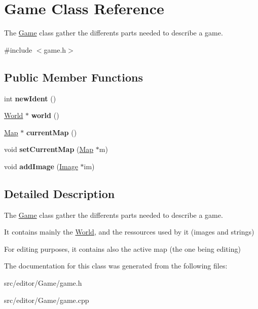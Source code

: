 \hypertarget{class_game}{\section{\-Game \-Class \-Reference}
\label{class_game}
}


\-The \hyperlink{class_game}{\-Game} class gather the differents parts needed to describe a game.  




{\ttfamily \#include $<$game.\-h$>$}

\subsection*{\-Public \-Member \-Functions}
\begin{DoxyCompactItemize}
\item 
\hypertarget{class_game_aeed0ba100700fb2f5d701fcf14d8871e}{int {\bfseries new\-Ident} ()}\label{class_game_aeed0ba100700fb2f5d701fcf14d8871e}

\item 
\hypertarget{class_game_a38feaf6c233d25c2ad353bab65559790}{\hyperlink{class_world}{\-World} $\ast$ {\bfseries world} ()}\label{class_game_a38feaf6c233d25c2ad353bab65559790}

\item 
\hypertarget{class_game_a3b242dcb7703b409692ce0c91e799a8c}{\hyperlink{class_map}{\-Map} $\ast$ {\bfseries current\-Map} ()}\label{class_game_a3b242dcb7703b409692ce0c91e799a8c}

\item 
\hypertarget{class_game_af7394ea8ff98b0b819125a6bac47db2b}{void {\bfseries set\-Current\-Map} (\hyperlink{class_map}{\-Map} $\ast$m)}\label{class_game_af7394ea8ff98b0b819125a6bac47db2b}

\item 
\hypertarget{class_game_a8c246c639e16c351b7f261dc44a0897d}{void {\bfseries add\-Image} (\hyperlink{class_image}{\-Image} $\ast$im)}\label{class_game_a8c246c639e16c351b7f261dc44a0897d}

\end{DoxyCompactItemize}


\subsection{\-Detailed \-Description}
\-The \hyperlink{class_game}{\-Game} class gather the differents parts needed to describe a game. 

\-It contains mainly the \hyperlink{class_world}{\-World}, and the ressources used by it (images and strings)

\-For editing purposes, it contains also the active map (the one being editing) 

\-The documentation for this class was generated from the following files\-:\begin{DoxyCompactItemize}
\item 
src/editor/\-Game/game.\-h\item 
src/editor/\-Game/game.\-cpp\end{DoxyCompactItemize}
